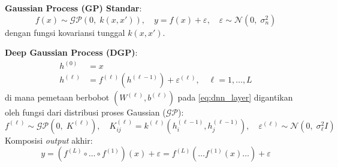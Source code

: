 \documentclass[11pt,a4paper]{article}
\def\boldsymbol#1{#1}%
\def\mathbf#1{#1}%
\theoremstyle{plain}
\theoremstyle{definition}
\theoremstyle{remark}
\begin{document}
\vspace{0.2cm}
\noindent \textbf{Gaussian Process (GP) Standar}:
\begin{equation}
f(\mathbf{x}) \sim \mathcal{GP}\left( 0, \; k(\mathbf{x}, \mathbf{x}') \right), \quad y = f(\mathbf{x}) + \varepsilon, \quad \varepsilon \sim \mathcal{N}\left(0, \; \sigma_n^2\right) \label{eq:gp_standard}
\end{equation}
dengan fungsi kovariansi tunggal $k(\mathbf{x}, \mathbf{x}')$.

\vspace{0.2cm}
\noindent \textbf{Deep Gaussian Process (DGP)}:
\begin{align}
\mathbf{h}^{(0)} &= \mathbf{x} \nonumber \\
\mathbf{h}^{(\ell)} &= \mathbf{f}^{(\ell)}(\mathbf{h}^{(\ell-1)}) + \boldsymbol{\varepsilon}^{(\ell)}, \quad \ell = 1, \dots, L \label{eq:dgp_layer}
\end{align}
di mana pemetaan berbobot $(W^{(\ell)}, \mathbf{b}^{(\ell)})$ pada \eqref{eq:dnn_layer} digantikan oleh fungsi dari distribusi proses Gaussian ($\mathcal{GP}$):
\begin{equation}
\mathbf{f}^{(\ell)} \sim \mathcal{GP}\left( \mathbf{0}, \; K^{(\ell)} \right), \quad K^{(\ell)}_{ij} = k^{(\ell)}\left(\mathbf{h}^{(\ell-1)}_i, \mathbf{h}^{(\ell-1)}_j\right), \quad \boldsymbol{\varepsilon}^{(\ell)} \sim \mathcal{N}\left(\mathbf{0}, \; \sigma_\ell^2 I\right) \label{eq:dgp_prior}
\end{equation}
Komposisi \textit{output} akhir:
\begin{equation}
\mathbf{y} = \left(\mathbf{f}^{(L)} \circ \dots \circ \mathbf{f}^{(1)}\right)(\mathbf{x}) + \boldsymbol{\varepsilon} = \mathbf{f}^{(L)}\left( \dots \mathbf{f}^{(1)}(\mathbf{x}) \dots \right) + \boldsymbol{\varepsilon} \label{eq:dgp_composition}
\end{equation}
\end{document}
